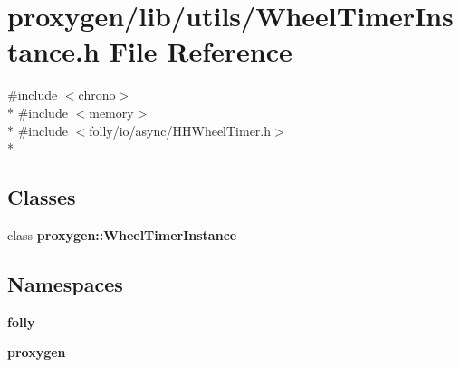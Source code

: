 \section{proxygen/lib/utils/\+Wheel\+Timer\+Instance.h File Reference}
\label{WheelTimerInstance_8h}
{\ttfamily \#include $<$chrono$>$}\\*
{\ttfamily \#include $<$memory$>$}\\*
{\ttfamily \#include $<$folly/io/async/\+H\+H\+Wheel\+Timer.\+h$>$}\\*
\subsection*{Classes}
\begin{DoxyCompactItemize}
\item 
class {\bf proxygen\+::\+Wheel\+Timer\+Instance}
\end{DoxyCompactItemize}
\subsection*{Namespaces}
\begin{DoxyCompactItemize}
\item 
 {\bf folly}
\item 
 {\bf proxygen}
\end{DoxyCompactItemize}
